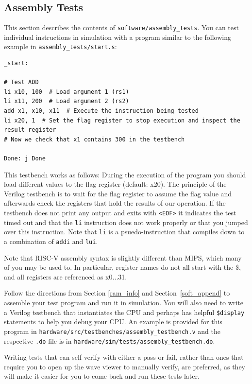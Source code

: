 \documentclass[11pt]{article}
\begin{document}
\subsection{Assembly Tests}
\label{assembly_tests}
This section describes the contents of \verb|software/assembly_tests|. You can test individual instructions in simulation with a program similar to the following example in \verb|assembly_tests/start.s|:

\begin{verbatim}
_start:

# Test ADD
li x10, 100  # Load argument 1 (rs1)
li x11, 200  # Load argument 2 (rs2)
add x1, x10, x11  # Execute the instruction being tested
li x20, 1  # Set the flag register to stop execution and inspect the result register
# Now we check that x1 contains 300 in the testbench

Done: j Done
\end{verbatim}

This testbench works as follows: During the execution of the program you should load different values to the flag register (default: x20). The principle of the Verilog testbench is to wait for the flag register to assume the flag value and afterwards check the registers that hold the results of our operation. If the testbench does not print any output and exits with \verb|<EOF>| it indicates the test timed out and that the \verb|li| instruction does not work properly or that you jumped over this instruction. Note that \verb|li| is a psuedo-instruction that compiles down to a combination of \verb|addi| and \verb|lui|.

Note that RISC-V assembly syntax is slightly different than MIPS, which many of you may be used to. In particular, register names do not all start with the \$, and all registers are referenced as x0$\dots$31.

Follow the directions from Section \ref{ram_info} and Section~\ref{soft_append} to assemble your test program and run it in simulation. You will also need to write a Verilog testbench that instantiates the CPU and perhaps has helpful \verb|$display| statements to help you debug your CPU. An example is provided for this program in \verb|hardware/src/testbenches/assembly_testbench.v| and the respective \verb|.do| file is in \verb|hardware/sim/tests/assembly_testbench.do|.

Writing tests that can self-verify with either a pass or fail, rather than ones that require you to open up the wave viewer to manually verify, are preferred, as they will make it easier for you to come back and run these tests later.
\end{document}

